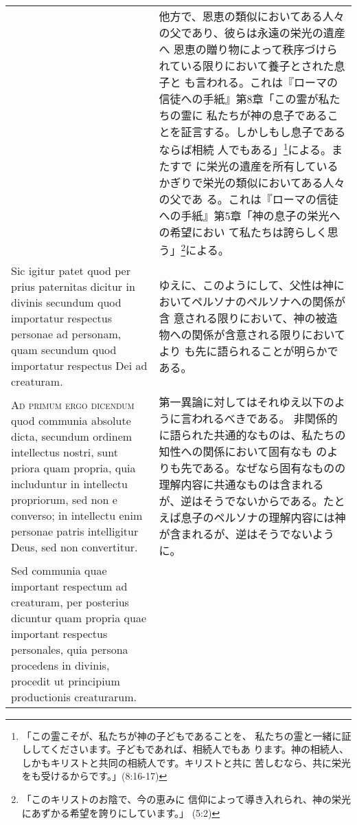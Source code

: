 \documentclass[10pt]{jsarticle} %
\begin{document}
\begin{longtable}{p{21em}p{21em}}
&

他方で、恩恵の類似においてある人々の父であり、彼らは永遠の栄光の遺産へ
 恩恵の贈り物によって秩序づけられている限りにおいて養子とされた息子と
も言われる。これは『ローマの信徒への手紙』第8章「この霊が私たちの霊に
 私たちが神の息子であることを証言する。しかしもし息子であるならば相続
 人でもある」\footnote{「この霊こそが、私たちが神の子どもであることを、
 私たちの霊と一緒に証ししてくださいます。子どもであれば、相続人でもあ
 ります。神の相続人、しかもキリストと共同の相続人です。キリストと共に
 苦しむなら、共に栄光をも受けるからです。」(8:16-17) }による。またすで
 に栄光の遺産を所有しているかぎりで栄光の類似においてある人々の父であ
 る。これは『ローマの信徒への手紙』第5章「神の息子の栄光への希望におい
 て私たちは誇らしく思う」\footnote{「このキリストのお陰で、今の恵みに
 信仰によって導き入れられ、神の栄光にあずかる希望を誇りにしています。」
 (5:2)}による。


\\

Sic igitur patet quod per prius paternitas dicitur in divinis
secundum quod importatur respectus personae ad personam, quam secundum
quod importatur respectus Dei ad creaturam.

&

ゆえに、このようにして、父性は神においてペルソナのペルソナへの関係が含
 意される限りにおいて、神の被造物への関係が含意される限りにおいてより
 も先に語られることが明らかである。

\\



{\scshape Ad primum ergo dicendum} quod communia absolute dicta, secundum ordinem
intellectus nostri, sunt priora quam propria, quia includuntur in
intellectu propriorum, sed non e converso; in intellectu enim personae
patris intelligitur Deus, sed non convertitur. 

&

第一異論に対してはそれゆえ以下のように言われるべきである。
非関係的に語られた共通的なものは、私たちの知性への関係において固有なも
 のよりも先である。なぜなら固有なものの理解内容に共通なものは含まれる
 が、逆はそうでないからである。たとえば息子のペルソナの理解内容には神
 が含まれるが、逆はそうでないように。

\\

Sed communia quae
important respectum ad creaturam, per posterius dicuntur quam propria
quae important respectus personales, quia persona procedens in
divinis, procedit ut principium productionis creaturarum. 


\end{longtable}
\end{document}
